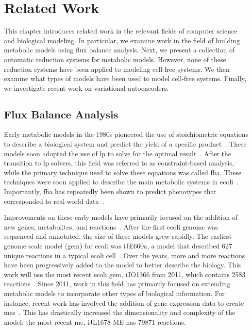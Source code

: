 \chapter{Related Work} \label{chap:rw}
This chapter introduces related work in the relevant fields of computer science and biological modeling.
In particular, we examine work in the field of building metabolic models using flux balance analysis.
Next, we present a collection of automatic reduction systems for metabolic models.
However, none of these reduction systems have been applied to modeling cell-free systems.
We then examine what types of models have been used to model cell-free systems.
Finally, we investigate recent work on variational autoencoders.

\section{Flux Balance Analysis}
Early metabolic models in the 1980s pioneered the use of stoichiometric equations to describe a biological system and predict the yield of a specific product~\cite{papoutsakis1984equations}.
These models soon adopted the use of \gls{lp} to solve for the optimal result~\cite{fell1986fat}.
After the transition to \gls{lp} solvers, this field was referred to as constraint-based analysis, while the primary technique used to solve these equations was called \gls{fba}.
These techniques were soon applied to describe the main metabolic systems in \gls{ecoli}~\cite{majewski1990simple}.
Importantly, \gls{fba} has repeatedly been shown to predict phenotypes that corresponded to real-world data~\cite{varma1994stoichiometric, edwards2001silico, segre2002analysis, bordbar2014constraint}.

Improvements on these early models have primarily focused on the addition of new genes, metabolites, and reactions~\cite{varma1993metabolic}.
After the first \gls{ecoli} genome was sequenced and annotated, the size of these models grew rapidly.
The earliest genome scale model (\gls{gem}) for \gls{ecoli} was iJE660a, a model that described 627 unique reactions in a typical \gls{ecoli} cell~\cite{edwards2000escherichia}.
Over the years, more and more reactions have been progressively added to the model to better describe the biology.
This work will use the most recent \gls{ecoli} \gls{gem}, iJO1366 from 2011, which contains 2583 reactions~\cite{orth2011comprehensive}.
Since 2011, work in this field has primarily focused on extending metabolic models to incorporate other types of biological information.
For instance, recent work has involved the addition of gene expression data to create \glspl{me}~\cite{lloyd2017cobrame}.
This has drastically increased the dimensionality and complexity of the model: the most recent \gls{me}, iJL1678-ME has 79871 reactions.

